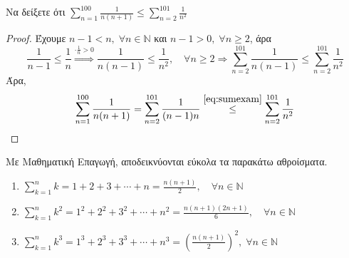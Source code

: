 \begin{exercise}
  Να δείξετε ότι $ \sum_{n=1}^{100} \frac{1}{n(n+1)} \leq \sum_{n=2}^{101} 
  \frac{1}{n^{2}} $
\end{exercise} 
\begin{proof}
\item {} 
  Έχουμε $ n-1 < n, \; \forall n \in \mathbb{N} $ και 
  $ n-1>0, \; \forall n \geq 2 $, άρα
  \begin{equation}\label{eq:sumexam}
    \frac{1}{n-1} \leq \frac{1}{n} \overset{\cdot \frac{1}{n} >0}{\Rightarrow}
    \frac{1}{n(n-1)} \leq \frac{1}{n^{2}}, \quad \forall n \geq 2 \Rightarrow 
    \sum_{n=2}^{101} \frac{1}{n(n-1)} \leq 
    \sum_{n=2}^{101} \frac{1}{n^{2}}
  \end{equation} 
  Άρα, 
  \[
    \sum_{n=1}^{100} \frac{1}{n(n+1)} = \sum_{n=2}^{101} \frac{1}{(n-1)n} 
    \overset{\eqref{eq:sumexam}}{\leq} \sum_{n=2}^{101} \frac{1}{n^{2}} 
  \]
\end{proof}

\begin{example}
  Με Μαθηματική Επαγωγή, αποδεικνύονται εύκολα τα παρακάτω αθροίσματα.
  \begin{enumerate}[wide,labelindent=0pt]
    \item $ \sum_{k=1}^{n} k = 1+2+3+\cdots+n = \frac{n(n+1)}{2}, 
      \quad \forall n \in \mathbb{N}  $
    \item $ \sum_{k=1}^{n} k^{2} =1^{2}+2^{2}+3^{2}+\cdots+n^{2} = 
      \frac{n(n+1)(2n+1)}{6}, \quad \forall n \in \mathbb{N} $
    \item $ \sum_{k=1}^{n} k^{3} = 1^{3}+2^{3}+3^{3}+\cdots +n^{3} = 
      \left(\frac{n(n+1)}{2} \right)^{2}, \; \forall n \in \mathbb{N} $
  \end{enumerate}
\end{example}





